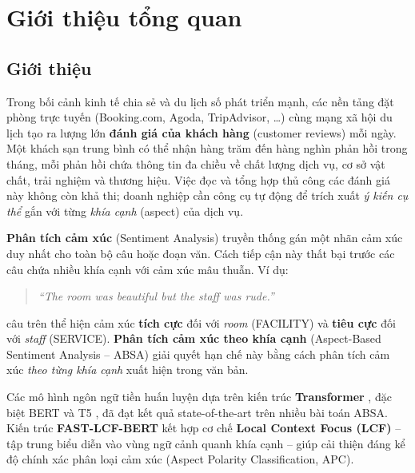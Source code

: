 \chapter{Giới thiệu tổng quan}
\label{chap:gioithieu}

\section{Giới thiệu}
\label{sec:gt_gioithieu}

Trong bối cảnh kinh tế chia sẻ và du lịch số phát triển mạnh, các nền tảng đặt phòng
trực tuyến (Booking.com, Agoda, TripAdvisor, \dots) cùng mạng xã hội du lịch tạo ra
lượng lớn \textbf{đánh giá của khách hàng} (customer reviews) mỗi ngày. Một khách sạn
trung bình có thể nhận hàng trăm đến hàng nghìn phản hồi trong tháng, mỗi phản hồi chứa
thông tin đa chiều về chất lượng dịch vụ, cơ sở vật chất, trải nghiệm và thương hiệu.
Việc đọc và tổng hợp thủ công các đánh giá này không còn khả thi; doanh nghiệp cần
công cụ tự động để trích xuất \emph{ý kiến cụ thể} gắn với từng \emph{khía cạnh}
(aspect) của dịch vụ.

\textbf{Phân tích cảm xúc} (Sentiment Analysis) truyền thống gán một nhãn cảm xúc duy nhất
cho toàn bộ câu hoặc đoạn văn. Cách tiếp cận này thất bại trước các câu chứa nhiều khía
cạnh với cảm xúc mâu thuẫn. Ví dụ:

\begin{quote}
\textit{``The room was beautiful but the staff was rude.''}
\end{quote}

\noindent câu trên thể hiện cảm xúc \textbf{tích cực} đối với \textit{room} (FACILITY)
và \textbf{tiêu cực} đối với \textit{staff} (SERVICE). \textbf{Phân tích cảm xúc theo
khía cạnh} (Aspect-Based Sentiment Analysis -- ABSA) \cite{pontiki2016semeval} giải quyết
hạn chế này bằng cách phân tích cảm xúc \emph{theo từng khía cạnh} xuất hiện trong văn bản.

Các mô hình ngôn ngữ tiền huấn luyện dựa trên kiến trúc \textbf{Transformer}
\cite{vaswani2023attentionneed}, đặc biệt BERT \cite{devlin2019bert} và T5
\cite{raffel2020t5}, đã đạt kết quả state-of-the-art trên nhiều bài toán ABSA.
Kiến trúc \textbf{FAST-LCF-BERT} \cite{zeng2019lcf, yang2021lcfatepc} kết hợp cơ chế
\textbf{Local Context Focus (LCF)} -- tập trung biểu diễn vào vùng ngữ cảnh quanh khía
cạnh -- giúp cải thiện đáng kể độ chính xác phân loại cảm xúc (Aspect Polarity
Classification, APC).

